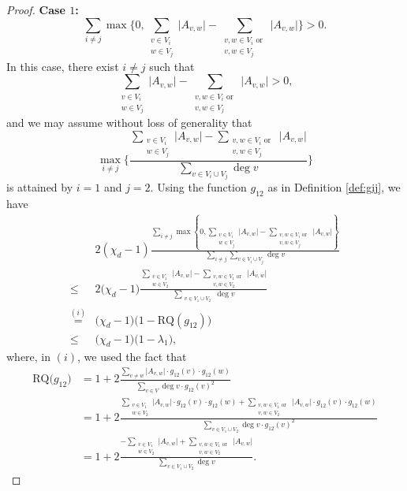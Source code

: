 \documentclass{article}
\newcommand{\RQ}{\textrm{RQ}}
\theoremstyle{plain}
\theoremstyle{definition}
\theoremstyle{remark}
\begin{document}
\begin{proof}
    
    \textbf{Case $1$:} 
    \[
    \sum_{i\neq j}\max\biggl\{0,\sum_{\substack{v\in V_i\\w\in V_j}}\bigl| A_{v,w}\bigr| - \sum_{\substack{v,w\in V_i \text{ or }\\ v,w\in V_j}}\bigl| A_{v,w}\bigr|\biggr\}>0.
    \]
    In this case, there exist $i\neq j$ such that $$\sum_{\substack{v\in V_i\\w\in V_j}}\bigl| A_{v,w}\bigr| - \sum_{\substack{v,w\in V_i \text{ or }\\ v,w\in V_j}}\bigl| A_{v,w}\bigr|>0,$$ and
    we may assume without loss of generality that
    \[
    \max_{i\neq j}\biggl\{\frac{\sum_{\substack{v\in V_i\\w\in V_j}}\bigl| A_{v,w}\bigr| - \sum_{\substack{v,w\in V_i \text{ or }\\ v,w\in V_j}}\bigl| A_{v,w}\bigr|}{\sum_{v\in V_i\cup V_j}\deg v}\biggr\}
    \]
    is attained by $i=1$ and $j=2$.
    Using the function $g_{12}$ as in Definition \ref{def:gij}, we have
    \begin{align*}
        &2(\chi_d-1) \frac{\sum_{i\neq j}\max\left\{0,\sum_{\substack{v\in V_i\\w\in V_j}}\bigl| A_{v,w}\bigr| - \sum_{\substack{v,w\in V_i \text{ or }\\ v,w\in V_j}}\bigl| A_{v,w}\bigr|\right\}}{\sum_{i\neq j}\sum_{v\in V_i\cup V_j}\deg v}\\
        \leq& 2\bigl(\chi_d-1\bigr) \frac{\sum_{\substack{v\in V_1\\w\in V_2}}\bigl| A_{v,w}\bigr| - \sum_{\substack{v,w\in V_1 \text{ or }\\ v,w\in V_2}}\bigl| A_{v,w}\bigr|}{\sum_{\substack{v\in V_1\cup V_2}}\deg v}\\
        \overset{(i)}{=}& \bigl(\chi_d-1\bigr)\bigl(1-\RQ(g_{12})\bigr) \\
        {\leq}& \bigl(\chi_d-1\bigr)\bigl(1- \lambda_{1}\bigr),
    \end{align*}
    where, in $(i)$, we used the fact that
    \begin{align*}
        \RQ\bigl(g_{12}\bigr) &= 1 + 2\frac{\sum_{v\neq w}\bigl|A_{v,w}\bigr| \cdot g_{12}(v) \cdot g_{12}(w)}{\sum_{v\in V}\deg v\cdot  g_{12}(v)^2}\\
        &= 1+ 2 \frac{\sum_{\substack{v\in V_1\\w\in V_2}}\bigl|A_{v,w}\bigr| \cdot g_{12}(v) \cdot g_{12}(w) +\sum_{\substack{v,w\in V_1 \text{ or } \\ v,w\in V_2}} \bigl|A_{v,w}\bigr| \cdot g_{12}(v) \cdot g_{12}(w)}{\sum_{v\in V_1 \cup V_2}\deg v\cdot g_{12}(v)^2}\\
        &= 1+2\frac{-\sum_{\substack{v\in V_1\\w\in V_2}}\bigl|A_{v,w}\bigr| +\sum_{\substack{v,w\in V_1 \text{ or } \\ v,w\in V_2}} \bigl|A_{v,w}\bigr|}{\sum_{v\in V_1 \cup V_2}\deg v}.
    \end{align*}


\end{proof}
\end{document}

